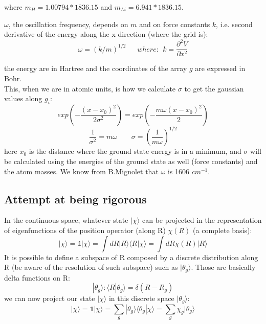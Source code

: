 where  $m_H=1.00794*1836.15$ and $m_{Li}=6.941*1836.15$.
\item $\omega$, the oscillation frequency, depends on $m$ and on force constants $k$, i.e. second derivative of the energy along the x direction (where the grid is):
\begin{equation}
\omega=(k/m)^{1/2} \ \ \ \ \ \ \ where: \ \ k=\dfrac{\partial^2V}{\partial x^2}
\end{equation}
\item the energy are in Hartree and the coordinates of the array $g$ are expressed in Bohr.\\
\ee
This, when we are in atomic units, is how we calculate $\sigma$ to get the gaussian values along $g_i$:
\begin{equation}
exp\left(-\dfrac{(x-x_0)^2}{2\sigma^2}\right) = exp\left(-\dfrac{m\omega(x-x_0)^2}{2}\right)
\end{equation}
\begin{equation}
\dfrac{1}{\sigma^2} = m\omega \ \ \ \ \ \ \ \ \ \sigma = \left(\dfrac{1}{m\omega}\right)^{1/2}
\end{equation}
here $x_0$ is the distance where the ground state energy is in a minimum, and $\sigma$ will be calculated using the energies of the ground state as well (force constants) and the atom masses. We know from B.Mignolet that $\omega$ is 1606 $cm^{-1}$.

\subsection{Attempt at being rigorous}
In the continuous space, whatever state $|\chi\rangle$ can be projected in the representation of eigenfunctions of the position operator (along R) $\chi(R)$ (a complete basis):
\begin{equation}
|\chi\rangle = \mathbb{1} |\chi\rangle = \int dR | R \rangle \langle R | \chi \rangle = \int dR \chi(R) | R \rangle 
\end{equation}
It is possible to define a subspace of R composed by a discrete distribution along R (be aware of the resolution of such subspace) such as $|\theta_g\rangle$. Those are basically delta functions on R:
\begin{equation}
|\theta_g\rangle : \langle R | \theta_g \rangle = \delta(R-R_g)
\end{equation}
we can now project our state $|\chi\rangle$ in this discrete space $|\theta_g\rangle$:
\begin{equation}
|\chi\rangle = \mathbb{1} |\chi\rangle = \sum_g  |\theta_g\rangle \langle \theta_g | \chi \rangle = \sum_g \chi_g |\theta_g\rangle
\end{equation}

